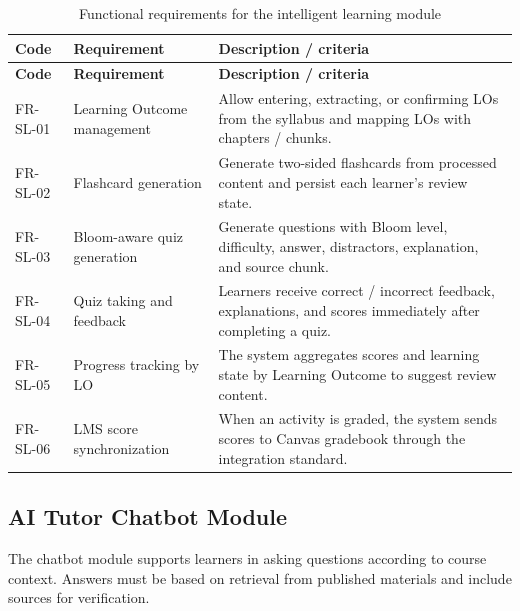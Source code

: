 \begin{longtable}{|p{2.4cm}|p{5.1cm}|p{6.9cm}|}
\caption{Functional requirements for the intelligent learning module}
\label{tab:fr-hoc-tap-thong-minh}\\
\hline
\textbf{Code} & \textbf{Requirement} & \textbf{Description / criteria} \\
\hline
\endfirsthead
\hline
\textbf{Code} & \textbf{Requirement} & \textbf{Description / criteria} \\
\hline
\endhead
FR-SL-01 & Learning Outcome management & Allow entering, extracting, or confirming LOs from the syllabus and mapping LOs with chapters / chunks. \\
\hline
FR-SL-02 & Flashcard generation & Generate two-sided flashcards from processed content and persist each learner's review state. \\
\hline
FR-SL-03 & Bloom-aware quiz generation & Generate questions with Bloom level, difficulty, answer, distractors, explanation, and source chunk. \\
\hline
FR-SL-04 & Quiz taking and feedback & Learners receive correct / incorrect feedback, explanations, and scores immediately after completing a quiz. \\
\hline
FR-SL-05 & Progress tracking by LO & The system aggregates scores and learning state by Learning Outcome to suggest review content. \\
\hline
FR-SL-06 & LMS score synchronization & When an activity is graded, the system sends scores to Canvas gradebook through the integration standard. \\
\hline
\end{longtable}

\subsection{AI Tutor Chatbot Module}
\label{subsec:module-ai-tutor-chatbot}

The chatbot module supports learners in asking questions according to course
context. Answers must be based on retrieval from published materials and
include sources for verification.

